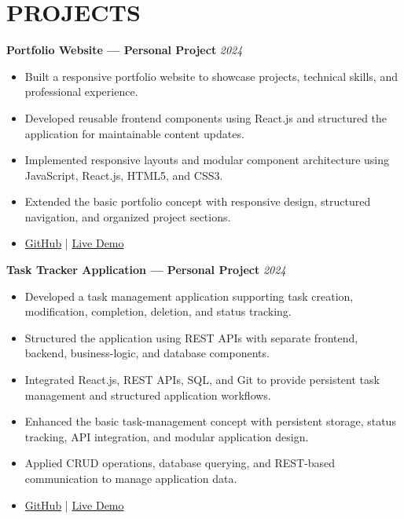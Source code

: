\documentclass[10pt,a4paper]{article}
\newcommand{\projectEntry}[2]{
    \textbf{#1} \hfill \textit{#2}
}
\begin{document}

\section*{PROJECTS}

\projectEntry
    {Portfolio Website --- Personal Project}
    {2024}

\begin{itemize}

    \item Built a responsive portfolio website to showcase projects,
    technical skills, and professional experience.

    \item Developed reusable frontend components using React.js and structured
    the application for maintainable content updates.

    \item Implemented responsive layouts and modular component architecture
    using JavaScript, React.js, HTML5, and CSS3.

    \item Extended the basic portfolio concept with responsive design,
    structured navigation, and organized project sections.

    \item \href{https://github.com/username/portfolio}{GitHub}
    \;|\;
    \href{https://portfolio-demo.com}{Live Demo}

\end{itemize}


\projectEntry
    {Task Tracker Application --- Personal Project}
    {2024}

\begin{itemize}

    \item Developed a task management application supporting task creation,
    modification, completion, deletion, and status tracking.

    \item Structured the application using REST APIs with separate frontend,
    backend, business-logic, and database components.

    \item Integrated React.js, REST APIs, SQL, and Git to provide persistent
    task management and structured application workflows.

    \item Enhanced the basic task-management concept with persistent storage,
    status tracking, API integration, and modular application design.

    \item Applied CRUD operations, database querying, and REST-based
    communication to manage application data.

    \item \href{https://github.com/username/task-tracker}{GitHub}
    \;|\;
    \href{https://tasktracker-demo.com}{Live Demo}

\end{itemize}
\end{document}
